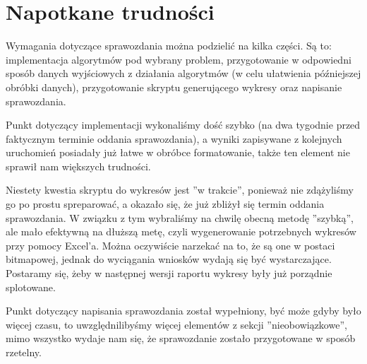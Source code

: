 \section{Napotkane trudności}
Wymagania dotyczące sprawozdania można podzielić na kilka części. Są to: implementacja algorytmów pod wybrany problem, przygotowanie w odpowiedni sposób danych wyjściowych z działania algorytmów (w celu ułatwienia późniejszej obróbki danych), przygotowanie skryptu generującego wykresy oraz napisanie sprawozdania.

Punkt dotyczący implementacji wykonaliśmy dość szybko (na dwa tygodnie przed faktycznym terminie oddania sprawozdania), a wyniki zapisywane z kolejnych uruchomień posiadały już łatwe w obróbce formatowanie, także ten element nie sprawił nam większych trudności.

Niestety kwestia skryptu do wykresów jest ''w trakcie'', ponieważ nie zdążyliśmy go po prostu spreparować, a okazało się, że już zbliżył się termin oddania sprawozdania. W związku z tym wybraliśmy na chwilę obecną metodę ''szybką'', ale mało efektywną na dłuższą metę, czyli wygenerowanie potrzebnych wykresów przy pomocy Excel'a. Można oczywiście narzekać na to, że są one w postaci bitmapowej, jednak do wyciągania wniosków wydają się być wystarczające. Postaramy się, żeby w następnej wersji raportu wykresy były już porządnie splotowane.

Punkt dotyczący napisania sprawozdania został wypełniony, być może gdyby było więcej czasu, to uwzględnilibyśmy więcej elementów z sekcji ''nieobowiązkowe'', mimo wszystko wydaje nam się, że sprawozdanie zostało przygotowane w sposób rzetelny.